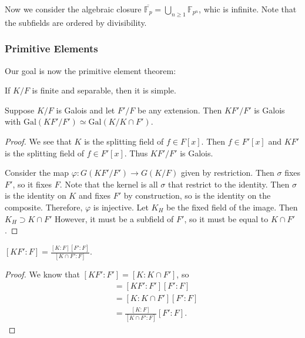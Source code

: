 \message{ !name(notes.tex)}\documentclass[10pt, twoside]{article}
\newcommand{\F}{\mathbb{F}}
\begin{document}
        Now we consider the algebraic closure $\overline{\F_p} = \bigcup_{n \geq 1} \F_{p^n}$, whic is infinite. Note that the subfields are ordered by divisibility.

        \subsubsection{Primitive Elements}

        Our goal is now the primitive element theorem:
        \begin{thm}
            If $K/F$ is finite and separable, then it is simple.
        \end{thm}

        \begin{prop}
            Suppose $K/F$ is Galois and let $F'/F$ be any extension. Then $KF'/F'$ is Galois with $\mathrm{Gal}(KF'/F') \simeq \mathrm{Gal}(K/K\cap F')$.
            \begin{proof}
                We see that $K$ is the splitting field of $f \in F[x]$. Then $f \in F'[x]$ and $KF'$ is the splitting field of $f \in F'[x]$. Thus $KF'/F'$ is Galois.

                Consider the map $\varphi: G(KF'/F') \to G(K/F)$ given by restriction. Then $\sigma$ fixes $F'$, so it fixes $F$. Note that the kernel is all $\sigma$ that restrict to the identity. Then $\sigma$ is the identity on $K$ and fixes $F'$ by construction, so is the identity on the composite. Therefore, $\varphi$ is injective. Let $K_H$ be the fixed field of the image. Then $K_H \supset K \cap F'$ However, it must be a subfield of $F'$, so it must be equal to $K \cap F'$.
            \end{proof}
        \end{prop}

        \begin{cor}
            $[KF':F] = \frac{[K:F][F':F]}{[K\cap F':F]}$.
            \begin{proof}
                We know that $[KF':F'] = [K:K\cap F']$, so
                \begin{align*}
                    [KF':F] &= [KF':F'][F':F] \\
                            &= [K:K\cap F'][F':F] \\
                            &= \frac{[K:F]}{[K \cap F':F]} [F':F].
                \end{align*}
            \end{proof}
        \end{cor}
\end{document}
